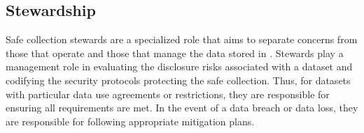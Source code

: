 %
%

\subsection{Stewardship}


Safe collection stewards are a specialized role that aims to separate
concerns from those that operate \NAME and those that manage the data stored in \NAMENS.
Stewards play a management role in evaluating the disclosure risks associated with a
dataset and codifying the security protocols protecting the safe collection.
Thus, for datasets with particular data use agreements or restrictions, they
are responsible for ensuring all requirements are met. In the event of a
data breach or data loss, they are responsible for following appropriate
mitigation plans.

